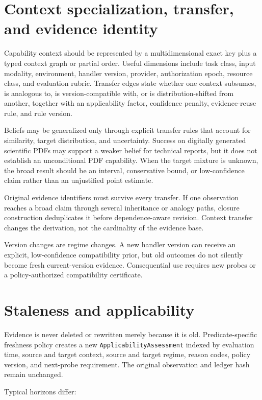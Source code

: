 \documentclass[11pt,oneside]{report}
\begin{document}
\section{Context specialization, transfer, and evidence identity}

Capability context should be represented by a multidimensional exact key plus a typed context graph or partial order. Useful dimensions include task class, input modality, environment, handler version, provider, authorization epoch, resource class, and evaluation rubric. Transfer edges state whether one context subsumes, is analogous to, is version-compatible with, or is distribution-shifted from another, together with an applicability factor, confidence penalty, evidence-reuse rule, and rule version.

Beliefs may be generalized only through explicit transfer rules that account for similarity, target distribution, and uncertainty. Success on digitally generated scientific PDFs may support a weaker belief for technical reports, but it does not establish an unconditional PDF capability. When the target mixture is unknown, the broad result should be an interval, conservative bound, or low-confidence claim rather than an unjustified point estimate.

Original evidence identifiers must survive every transfer. If one observation reaches a broad claim through several inheritance or analogy paths, closure construction deduplicates it before dependence-aware revision. Context transfer changes the derivation, not the cardinality of the evidence base.

Version changes are regime changes. A new handler version can receive an explicit, low-confidence compatibility prior, but old outcomes do not silently become fresh current-version evidence. Consequential use requires new probes or a policy-authorized compatibility certificate.

\section{Staleness and applicability}

Evidence is never deleted or rewritten merely because it is old. Predicate-specific freshness policy creates a new \texttt{ApplicabilityAssessment} indexed by evaluation time, source and target context, source and target regime, reason codes, policy version, and next-probe requirement. The original observation and ledger hash remain unchanged.

Typical horizons differ:
\end{document}
